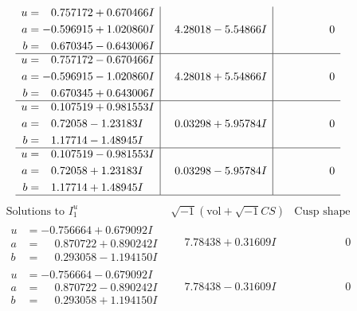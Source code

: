 \documentclass[1p]{elsarticle_modified}
\theoremstyle{definition}
\newcommand{\I}{\sqrt{-1}}
\begin{document}
$$\begin{array}{c|c|c}
\begin{aligned}
u &= \phantom{-}0.757172 + 0.670466 I \\
a &= -0.596915 + 1.020860 I \\
b &= \phantom{-}0.670345 - 0.643006 I\end{aligned}
 & \phantom{-}4.28018 - 5.54866 I & \phantom{-0.000000 } 0 \\ \hline\begin{aligned}
u &= \phantom{-}0.757172 - 0.670466 I \\
a &= -0.596915 - 1.020860 I \\
b &= \phantom{-}0.670345 + 0.643006 I\end{aligned}
 & \phantom{-}4.28018 + 5.54866 I & \phantom{-0.000000 } 0 \\ \hline\begin{aligned}
u &= \phantom{-}0.107519 + 0.981553 I \\
a &= \phantom{-}0.72058 - 1.23183 I \\
b &= \phantom{-}1.17714 - 1.48945 I\end{aligned}
 & \phantom{-}0.03298 + 5.95784 I & \phantom{-0.000000 } 0 \\ \hline\begin{aligned}
u &= \phantom{-}0.107519 - 0.981553 I \\
a &= \phantom{-}0.72058 + 1.23183 I \\
b &= \phantom{-}1.17714 + 1.48945 I\end{aligned}
 & \phantom{-}0.03298 - 5.95784 I & \phantom{-0.000000 } 0\\
 \hline 
 \end{array}$$\newpage$$\begin{array}{c|c|c}  
\text{Solutions to }I^u_{1}& \I (\text{vol} + \sqrt{-1}CS) & \text{Cusp shape}\\
 \hline 
\begin{aligned}
u &= -0.756664 + 0.679092 I \\
a &= \phantom{-}0.870722 + 0.890242 I \\
b &= \phantom{-}0.293058 - 1.194150 I\end{aligned}
 & \phantom{-}7.78438 + 0.31609 I & \phantom{-0.000000 } 0 \\ \hline\begin{aligned}
u &= -0.756664 - 0.679092 I \\
a &= \phantom{-}0.870722 - 0.890242 I \\
b &= \phantom{-}0.293058 + 1.194150 I\end{aligned}
 & \phantom{-}7.78438 - 0.31609 I & \phantom{-0.000000 } 0 \\ \hline\begin{aligned}

\end{aligned}
\end{array}$$
\end{document}
